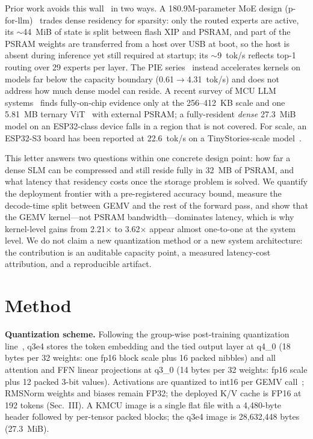 \documentclass[journal,letterpaper]{IEEEtran}
\begin{document}
Prior work avoids this wall~\cite{memorywall} in two ways. A 180.9M-parameter MoE design (p-for-llm)~\cite{pforllm} trades
dense residency for sparsity: only the routed experts are active, its $\sim$44~MiB of state
is split between flash XIP and PSRAM, and part of the PSRAM weights are transferred from a
host over USB at boot, so the host is absent during inference yet still required at startup;
its $\sim$9~tok/s reflects top-1 routing over 29 experts per layer. The PIE series~\cite{pie} instead
accelerates kernels on models far below the capacity boundary (0.61$\rightarrow$4.31~tok/s)
and does not address how much dense model can reside. A recent survey of MCU LLM systems~\cite{survey}
finds fully-on-chip evidence only at the 256--412~KB scale and one 5.81~MB ternary ViT~\cite{ternaryvit} with
external PSRAM; a fully-resident \emph{dense} 27.3~MiB model on an ESP32-class device falls
in a region that is not covered. For scale, an ESP32-S3 board has been reported at 22.6~tok/s on a TinyStories-scale model~\cite{edgebench}.

This letter answers two questions within one concrete design point: how far a dense SLM can be
compressed and still reside fully in 32~MB of PSRAM, and what latency that residency costs once
the storage problem is solved. We quantify the deployment frontier with a pre-registered
accuracy bound, measure the decode-time split between GEMV and the rest of the forward pass,
and show that the GEMV kernel---not PSRAM bandwidth---dominates latency, which is why
kernel-level gains from 2.21$\times$ to 3.62$\times$ appear almost one-to-one at the system level. We do not claim a new
quantization method or a new system architecture: the contribution is an auditable capacity point,
a measured latency-cost attribution, and a reproducible artifact.

\section{Method}
\textbf{Quantization scheme.} Following the group-wise post-training quantization line~\cite{gptq,awq,llmint8}, q3e4 stores the token embedding and the tied output layer at
q4\_0 (18 bytes per 32 weights: one fp16 block scale plus 16 packed nibbles) and all attention
and FFN linear projections at q3\_0 (14 bytes per 32 weights: fp16 scale plus 12 packed
3-bit values). Activations are quantized to int16 per GEMV call~\cite{int16}; RMSNorm weights and biases remain FP32; the deployed K/V cache is FP16 at 192 tokens (Sec.~III). A KMCU image is a single flat file with a 4,480-byte header followed
by per-tensor packed blocks; the q3e4 image is 28,632,448 bytes (27.3~MiB).
\end{document}
